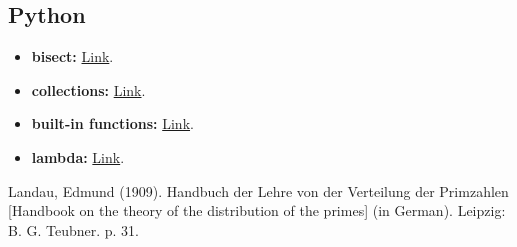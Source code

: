 \documentclass[12pt]{article}
\begin{document}
\subsection{Python}

\begin{itemize}
    \item \textbf{bisect:} \href{https://docs.python.org/3.0/library/bisect.html}{Link}.
    \item \textbf{collections:} \href{https://docs.python.org/3/library/collections.html}{Link}.
    \item \textbf{built-in functions: } \href{https://docs.python.org/3/library/functions.html}{Link}.
    \item \textbf{lambda:} \href{https://www.w3schools.com/python/python_lambda.asp}{Link}.
\end{itemize}

\begin{thebibliography}{9}

   Landau, Edmund (1909). Handbuch der Lehre von der Verteilung der Primzahlen [Handbook on the theory of the distribution of the primes] (in German). Leipzig: B. G. Teubner. p. 31.

\end{thebibliography}
\end{document}
